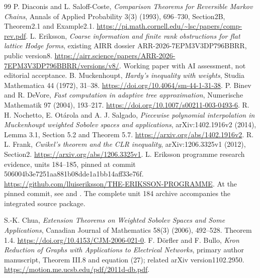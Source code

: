 \documentclass[11pt]{article}
\begin{document}
\begin{thebibliography}{99}
 P. Diaconis and L. Saloff-Coste,
\emph{Comparison Theorems for Reversible Markov Chains},
Annals of Applied Probability 3(3) (1993), 696--730,
Section2B, Theorem2.1 and Example2.1.
\url{https://pi.math.cornell.edu/~lsc/papers/comp-rev.pdf}.
 L. Eriksson, \emph{Coarse information and finite rank
obstructions for flat lattice Hodge forms}, existing AIRR dossier
ARR-2026-7EPM3V3DP796BBRR, public version8.
\url{https://airr.science/papers/ARR-2026-7EPM3V3DP796BBRR/versions/v8/}.
Working paper with AI assessment, not editorial acceptance.
 B. Muckenhoupt, \emph{Hardy's inequality with weights},
Studia Mathematica 44 (1972), 31--38.
\url{https://doi.org/10.4064/sm-44-1-31-38}.
 P. Binev and R. DeVore, \emph{Fast computation in adaptive
tree approximation}, Numerische Mathematik 97 (2004), 193--217.
\url{https://doi.org/10.1007/s00211-003-0493-6}.
 R. H. Nochetto, E. Ot\'arola and A. J. Salgado,
\emph{Piecewise polynomial interpolation in Muckenhoupt weighted Sobolev
spaces and applications}, arXiv:1402.1916v2 (2014), Lemma 3.1,
Section 5.2 and Theorem 5.7. \url{https://arxiv.org/abs/1402.1916v2}.
 R. L. Frank, \emph{Cwikel's theorem and the CLR inequality},
arXiv:1206.3325v1 (2012), Section2.
\url{https://arxiv.org/abs/1206.3325v1}.
 L. Eriksson programme research evidence, units 184--185,
pinned at commit 506004b3e7251aa881b08dde1a1bb14aff33e76f.
\url{https://github.com/lluiseriksson/THE-ERIKSSON-PROGRAMME}.
At the pinned commit, see 
and .
The complete unit 184 archive accompanies the integrated source package.

 S.-K. Chua, \emph{Extension Theorems on Weighted
Sobolev Spaces and Some Applications}, Canadian Journal of Mathematics
58(3) (2006), 492--528. Theorem 1.4.
\url{https://doi.org/10.4153/CJM-2006-021-0}.
 F. D\"orfler and F. Bullo, \emph{Kron Reduction of
Graphs with Applications to Electrical Networks}, primary author manuscript,
Theorem III.8 and equation (27); related arXiv version1102.2950.
\url{https://motion.me.ucsb.edu/pdf/2011d-db.pdf}.
\end{thebibliography}
\end{document}
